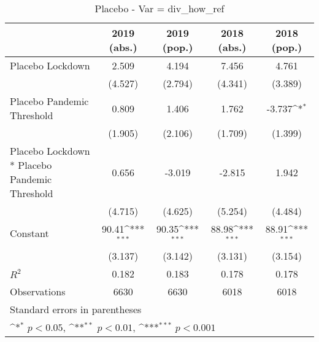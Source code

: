 \documentclass{article}
\begin{document}
{
\def\sym#1{\ifmmode^{#1}\else\(^{#1}\)\fi}
\begin{longtable}{l*{4}{c}}
\caption{Placebo - Var = div\_how\_ref}\\
\hline\hline\endfirsthead\hline\endhead\hline\endfoot\endlastfoot
                &\multicolumn{1}{c}{2019 (abs.)}&\multicolumn{1}{c}{2019 (pop.)}&\multicolumn{1}{c}{2018 (abs.)}&\multicolumn{1}{c}{2018 (pop.)}\\
\hline
Placebo Lockdown&    2.509         &    4.194         &    7.456         &    4.761         \\
                &  (4.527)         &  (2.794)         &  (4.341)         &  (3.389)         \\
Placebo Pandemic Threshold&    0.809         &    1.406         &    1.762         &   -3.737\sym{*}  \\
                &  (1.905)         &  (2.106)         &  (1.709)         &  (1.399)         \\
Placebo Lockdown * Placebo Pandemic Threshold&    0.656         &   -3.019         &   -2.815         &    1.942         \\
                &  (4.715)         &  (4.625)         &  (5.254)         &  (4.484)         \\
Constant        &    90.41\sym{***}&    90.35\sym{***}&    88.98\sym{***}&    88.91\sym{***}\\
                &  (3.137)         &  (3.142)         &  (3.131)         &  (3.154)         \\
\hline
\(R^{2}\)       &    0.182         &    0.183         &    0.178         &    0.178         \\
Observations    &     6630         &     6630         &     6018         &     6018         \\
\hline\hline
\multicolumn{5}{l}{\footnotesize Standard errors in parentheses}\\
\multicolumn{5}{l}{\footnotesize \sym{*} \(p<0.05\), \sym{**} \(p<0.01\), \sym{***} \(p<0.001\)}\\
\end{longtable}
}
\end{document}
